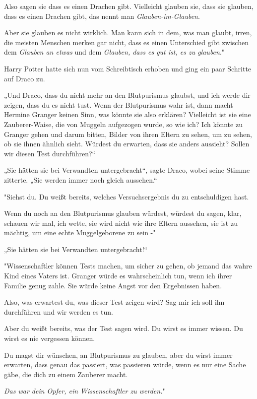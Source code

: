 {Also sagen sie dass es einen Drachen gibt. Vielleicht glauben sie, dass sie glauben, dass es einen Drachen gibt, das nennt man \emph{Glauben-im-Glauben}.

Aber sie glauben es nicht wirklich. Man kann sich in dem, was man glaubt, irren, die meisten Menschen merken gar nicht, dass es einen Unterschied gibt zwischen dem \emph{Glauben an etwas} und dem \emph{Glauben, dass es gut ist, es zu glauben}."

Harry Potter hatte sich nun vom Schreibtisch erhoben und ging ein paar Schritte auf Draco zu.

„Und Draco, dass du nicht mehr an den Blutpurismus glaubst, und ich werde dir zeigen, dass du es nicht tust. Wenn der Blutpurismus wahr ist, dann macht Hermine Granger keinen Sinn, was könnte sie also erklären? Vielleicht ist sie eine Zauberer-Waise, die von Muggeln aufgezogen wurde, so wie ich? Ich könnte zu Granger gehen und darum bitten, Bilder von ihren Eltern zu sehen, um zu sehen, ob sie ihnen ähnlich sieht. Würdest du erwarten, dass sie anders aussieht? Sollen wir diesen Test durchführen?“

„Sie hätten sie bei Verwandten untergebracht“, sagte Draco, wobei seine Stimme zitterte. „Sie werden immer noch gleich aussehen.“

"Siehst du. Du weißt bereits, welches Versuchsergebnis du zu entschuldigen hast.

Wenn du noch an den Blutpurismus glauben würdest, würdest du sagen, klar, schauen wir mal, ich wette, sie wird nicht wie ihre Eltern aussehen, sie ist zu mächtig, um eine echte Muggelgeborene zu sein -"

„Sie hätten sie bei Verwandten untergebracht!“

"Wissenschaftler können Tests machen, um sicher zu gehen, ob jemand das wahre Kind eines Vaters ist. Granger würde es wahrscheinlich tun, wenn ich ihrer Familie genug zahle. Sie würde keine Angst vor den Ergebnissen haben.

Also, was erwartest du, was dieser Test zeigen wird? Sag mir ich soll ihn durchführen und wir werden es tun.

Aber du weißt bereits, was der Test sagen wird. Du wirst es immer wissen. Du wirst es nie vergessen können.

Du magst dir wünschen, an Blutpurismus zu glauben, aber du wirst immer erwarten, dass genau das passiert, was passieren würde, wenn es nur eine Sache gäbe, die dich zu einem Zauberer macht.

\emph{Das war dein Opfer, ein Wissenschaftler zu werden.}"

}
